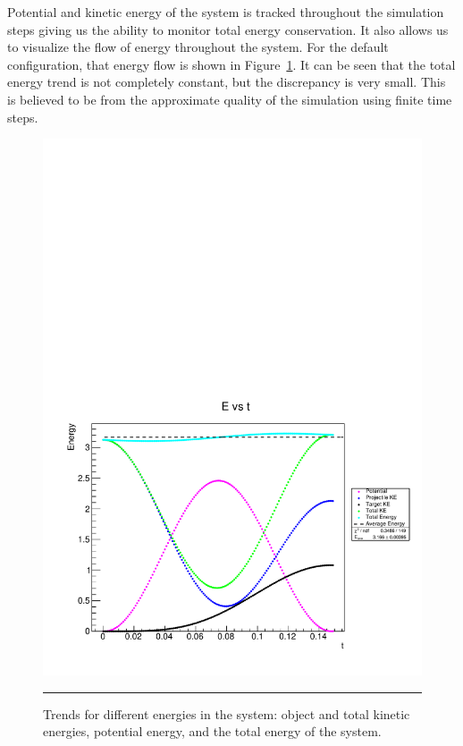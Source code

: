 \documentclass[aps,prl,floatfix,preprint,nofootinbib]{revtex4}
\begin{document}
Potential and kinetic energy of the system is tracked throughout the simulation steps giving us the ability to monitor total energy conservation. It also allows us to visualize the flow of energy throughout the system. For the default configuration, that energy flow is shown in Figure~\ref{fig:energy_default}. It can be seen that the total energy trend is not completely constant, but the discrepancy is very small. This is believed to be from the approximate quality of the simulation using finite time steps.
\begin{figure}
  \includegraphics[width=.8\textwidth]{plots/default/E_vs_t.pdf}
                  {\par\nobreak\rule[9pt]{35em}{0.5pt}\vspace{-5mm}}
                  \caption{Trends for different energies in the system: object and total kinetic energies, potential energy, and the total energy of the system.}
                  \label{fig:energy_default}
\end{figure}
\end{document}
